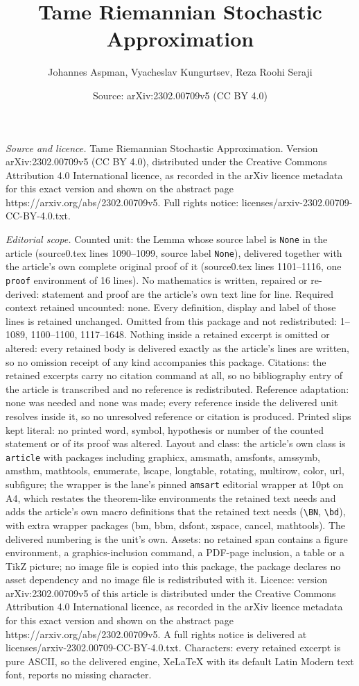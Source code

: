 \documentclass[10pt,a4paper]{amsart}
\title[Tame Riemannian Stochastic Approximation]{Tame Riemannian Stochastic Approximation}
\author{Johannes Aspman, Vyacheslav Kungurtsev, Reza Roohi Seraji}
\date{Source: arXiv:2302.00709v5 (CC BY 4.0)}
\begin{document}
\maketitle

\noindent\emph{Source and licence.} Tame Riemannian Stochastic Approximation. Version arXiv:2302.00709v5 (CC BY 4.0), distributed under the Creative Commons Attribution 4.0 International licence, as recorded in the arXiv licence metadata for this exact version and shown on the abstract page https://arxiv.org/abs/2302.00709v5. Full rights notice: licenses/arxiv-2302.00709-CC-BY-4.0.txt.\par\smallskip

\noindent\textit{Editorial scope.} Counted unit: the Lemma whose source label is \texttt{None} in the article (source0.tex lines 1090--1099, source label \texttt{None}), delivered together with the article's own complete original proof of it (source0.tex lines 1101--1116, one \texttt{proof} environment of 16 lines). No mathematics is written, repaired or re-derived: statement and proof are the article's own text line for line. Required context retained uncounted: none. Every definition, display and label of those lines is retained unchanged. Omitted from this package and not redistributed: 1--1089, 1100--1100, 1117--1648. Nothing inside a retained excerpt is omitted or altered: every retained body is delivered exactly as the article's lines are written, so no omission receipt of any kind accompanies this package. Citations: the retained excerpts carry no citation command at all, so no bibliography entry of the article is transcribed and no reference is redistributed. Reference adaptation: none was needed and none was made; every reference inside the delivered unit resolves inside it, so no unresolved reference or citation is produced. Printed slips kept literal: no printed word, symbol, hypothesis or number of the counted statement or of its proof was altered. Layout and class: the article's own class is \texttt{article} with packages including graphicx, amsmath, amsfonts, amssymb, amsthm, mathtools, enumerate, lscape, longtable, rotating, multirow, color, url, subfigure; the wrapper is the lane's pinned \texttt{amsart} editorial wrapper at 10pt on A4, which restates the theorem-like environments the retained text needs and adds the article's own macro definitions that the retained text needs (\texttt{\textbackslash BN}, \texttt{\textbackslash bd}), with extra wrapper packages (bm, bbm, dsfont, xspace, cancel, mathtools). The delivered numbering is the unit's own. Assets: no retained span contains a figure environment, a graphics-inclusion command, a PDF-page inclusion, a table or a TikZ picture; no image file is copied into this package, the package declares no asset dependency and no image file is redistributed with it. Licence: version arXiv:2302.00709v5 of this article is distributed under the Creative Commons Attribution 4.0 International licence, as recorded in the arXiv licence metadata for this exact version and shown on the abstract page https://arxiv.org/abs/2302.00709v5. A full rights notice is delivered at licenses/arxiv-2302.00709-CC-BY-4.0.txt. Characters: every retained excerpt is pure ASCII, so the delivered engine, XeLaTeX with its default Latin Modern text font, reports no missing character.
\end{document}
